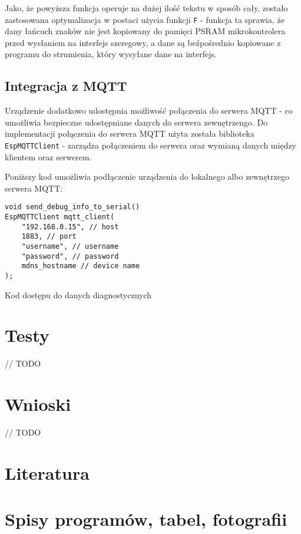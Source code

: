 \documentclass[12pt,a4paper]{article}
\begin{document}
Jako, że powyższa funkcja operuje na dużej ilość tekstu w sposób cały, zostało zastosowana optymalizacja w postaci użycia funkcji 
\texttt{F} - funkcja ta sprawia, że dany łańcuch znaków nie jest kopiowany do pamięci PSRAM mikrokontrolera przed wysłaniem na interfejs szeregowy, 
a dane są beźpośrednio kopiowane z programu do strumienia, który wysyłane dane na interfejs. 

\subsection{Integracja z MQTT}

Urządzenie dodatkowo udostępnia możliwość połączenia do serwera MQTT - co umożliwia bezpieczne udostępniane danych do serwera zewnętrzengo.
Do implementacji połączenia do serwera MQTT użyta została biblioteka \texttt{EspMQTTClient}\cite{esp32-mqtt-server-library} - 
zarządza połączeniem do serwera oraz wymianą danych między klientem oraz serwerem.

Poniższy kod umożliwia podłączenie urządzenia do lokalnego albo zewnętrzego serwera MQTT: 
\begin{code}[H]
\begin{verbatim}
void send_debug_info_to_serial()
EspMQTTClient mqtt_client(
    "192.168.0.15", // host
    1883, // port
    "username", // username
    "password", // password
    mdns_hostname // device name
);
\end{verbatim}
\caption{Kod dostępu do danych diagnostycznych}
\label{diagnostic-data-code}
\end{code}

\section{Testy}
// TODO

\section{Wnioski}
// TODO

\section{Literatura}

\printbibliography[heading=none]

\section{Spisy programów, tabel, fotografii}
\listoftables
{}
\end{document}
